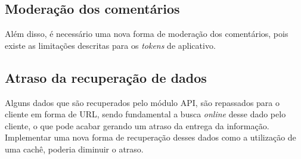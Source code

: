 \subsection{Moderação dos comentários}
Além disso, é necessário uma nova forma de moderação dos comentários, pois existe as limitações descritas para os \textit{tokens} de aplicativo.

\subsection{Atraso da recuperação de dados}
Alguns dados que são recuperados pelo módulo API, são repassados para o cliente em forma de URL, sendo fundamental a busca \textit{online} desse dado pelo cliente, o que pode acabar gerando um atraso da entrega da informação. Implementar uma nova forma de recuperação desses dados como a utilização de uma cachê, poderia diminuir o atraso. 

